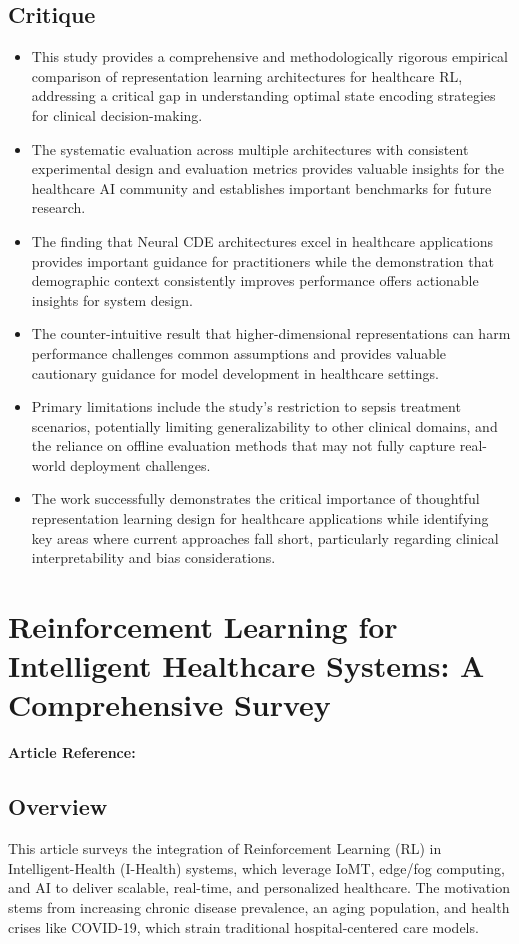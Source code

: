 \subsection*{Critique}
\begin{itemize}
    \item This study provides a comprehensive and methodologically rigorous empirical comparison of representation learning architectures for healthcare RL, addressing a critical gap in understanding optimal state encoding strategies for clinical decision-making.
    \item The systematic evaluation across multiple architectures with consistent experimental design and evaluation metrics provides valuable insights for the healthcare AI community and establishes important benchmarks for future research.
    \item The finding that Neural CDE architectures excel in healthcare applications provides important guidance for practitioners while the demonstration that demographic context consistently improves performance offers actionable insights for system design.
    \item The counter-intuitive result that higher-dimensional representations can harm performance challenges common assumptions and provides valuable cautionary guidance for model development in healthcare settings.
    \item Primary limitations include the study's restriction to sepsis treatment scenarios, potentially limiting generalizability to other clinical domains, and the reliance on offline evaluation methods that may not fully capture real-world deployment challenges.
    \item The work successfully demonstrates the critical importance of thoughtful representation learning design for healthcare applications while identifying key areas where current approaches fall short, particularly regarding clinical interpretability and bias considerations.
\end{itemize}

\section{Reinforcement Learning for Intelligent Healthcare Systems: A Comprehensive Survey}
\textbf{Article Reference:} \cite{abdellatifReinforcementLearningIntelligent2021}

\subsection*{Overview}
This article surveys the integration of Reinforcement Learning (RL) in Intelligent-Health (I-Health) systems, which leverage IoMT, edge/fog computing, and AI to deliver scalable, real-time, and personalized healthcare. The motivation stems from increasing chronic disease prevalence, an aging population, and health crises like COVID-19, which strain traditional hospital-centered care models.

